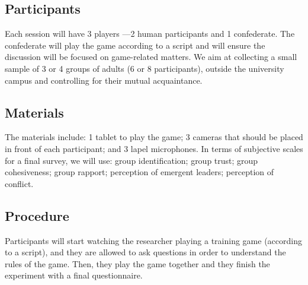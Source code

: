 \subsection{Participants}
Each session will have 3 players ---2 human participants and 1 confederate. The confederate will play the game according to a script and will ensure the discussion will be focused on game-related matters. We aim at collecting a small sample of 3 or 4 groups of adults (6 or 8 participants), outside the university campus and controlling for their mutual acquaintance.

\subsection{Materials}
The materials include: 1 tablet to play the game; 3 cameras that should be placed in front of each participant; and 3 lapel microphones. In terms of subjective scales for a final survey, we will use: group identification\cite{leach2008group}; group trust\cite{allen2004exploring}; group cohesiveness\cite{hoegl2001teamwork}; group rapport\cite{lafrance1979nonverbal}; perception of emergent leaders; perception of conflict.

\subsection{Procedure}
Participants will start watching the researcher playing a training game (according to a script), and they are allowed to ask questions in order to understand the rules of the game. Then, they play the game together and they finish the experiment with a final questionnaire.


